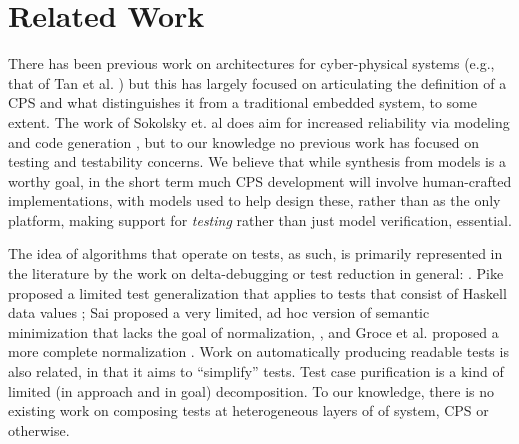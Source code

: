 \section{Related Work}

There has been previous work on architectures for cyber-physical systems (e.g., that of Tan et al. \cite{tan2008prototype}) but this has largely focused on articulating the definition of a CPS and what distinguishes it from a traditional embedded system, to some extent.  The work of Sokolsky et. al does aim for increased reliability via modeling and code generation \cite{sokolsky2014architecture}, but to our knowledge no previous work has focused on testing and testability concerns.  We believe that while synthesis from models is a worthy goal, in the short term much CPS development will involve human-crafted implementations, with models used to help design these, rather than as the only platform, making support for \emph{testing} rather than just model verification, essential.

The idea of algorithms that operate on tests, as such, is
primarily represented in the literature by the work on
delta-debugging or test reduction in general:
\cite{DD,HDD,TCminim,MinUnit,CReduce,Lithium,DDISSTA,IsolThread,Yesterday}.  Pike proposed a limited test
generalization that applies to tests that consist of Haskell data
values \cite{SmartCheck}; Sai proposed a very limited, ad hoc
version of semantic minimization that lacks the goal of normalization,
 \cite{SaiSimple}, and Groce et al. proposed a more complete normalization \cite{OneTest}.  Work on automatically producing readable tests \cite{Guava,Readable} is also
related, in that it aims to ``simplify'' tests.  Test case
purification \cite{PureTest} is a kind of limited (in approach and in
goal) decomposition.  To our knowledge, there is no existing work on composing tests at heterogeneous layers of of system, CPS or otherwise.